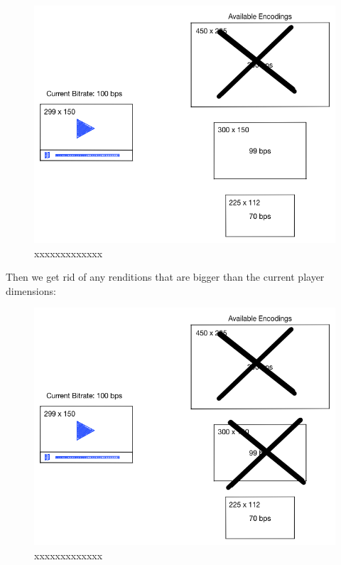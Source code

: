 \begin{figure}[htb] %
 \centering
 \includegraphics[width=1.0\linewidth]{images/chapter4/bitrate-switching-2.png}\hfill
 \caption[xxxxxxxxx]{xxxxxxxxxxxxx}
 \label{fig:fourV}
\end{figure}

Then we get rid of any renditions that are bigger than the current player dimensions:


\begin{figure}[htb] %
 \centering
 \includegraphics[width=1.0\linewidth]{images/chapter4/bitrate-switching-3.png}\hfill
 \caption[xxxxxxxxx]{xxxxxxxxxxxxx}
 \label{fig:fourV}
\end{figure}

